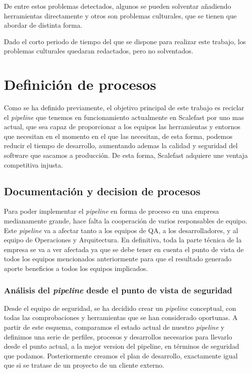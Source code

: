 \documentclass[12pt]{report} %
\begin{document}
De entre estos problemas detectados, algunos se pueden solventar añadiendo
herramientas directamente y otros son problemas culturales, que se tienen que
abordar de distinta forma.

Dado el corto periodo de tiempo del que se dispone para realizar este trabajo,
los problemas culturales quedaran redactados, pero no solventados. 

\section{Definición de procesos}

Como se ha definido previamente, el objetivo principal de este trabajo es
reciclar el \textit{\gls{pipeline}} que tenemos en funcionamiento actualmente en
Scalefast por uno mas actual, que sea capaz de proporcionar a los equipos las
herramientas y entornos que necesitan en el momento en el que las necesitan, de
esta forma, podemos reducir el tiempo de desarrollo, aumentando ademas la
calidad y seguridad del software que sacamos a producción.  De esta forma,
Scalefast adquiere une ventaja competitiva injusta.

\subsection{Documentación y decision de procesos}

Para poder implementar el \textit{\gls{pipeline}} en forma de proceso en una
empresa medianamente grande, hace falta la cooperación de varios responsables de
equipo.  Este \textit{\gls{pipeline}} va a afectar tanto a los equipos de QA, a
los desarrolladores, y al equipo de Operaciones y Arquitectura.  En definitiva,
toda la parte técnica de la empresa se va a ver afectada ya que se debe tener en
cuenta el punto de vista de todos los equipos mencionados anteriormente para que
el resultado generado aporte beneficios a todos los equipos implicados.

\subsubsection{Análisis del \textit{\gls{pipeline}} desde el punto de vista de
seguridad}

Desde el equipo de seguridad, se ha decidido crear un \textit{\gls{pipeline}}
conceptual, con todas las comprobaciones y herramientas que se han considerado
oportunas.  A partir de este esquema, comparamos el estado actual de nuestro
\textit{\gls{pipeline}} y definimos una serie de perfiles, procesos y
desarrollos necesarios para llevarlo desde el punto actual, a la mejor version
del pipeline, en términos de seguridad que podamos.  Posteriormente creamos el
plan de desarrollo, exactamente igual que si se tratase de un proyecto de un
cliente externo.
\end{document}

